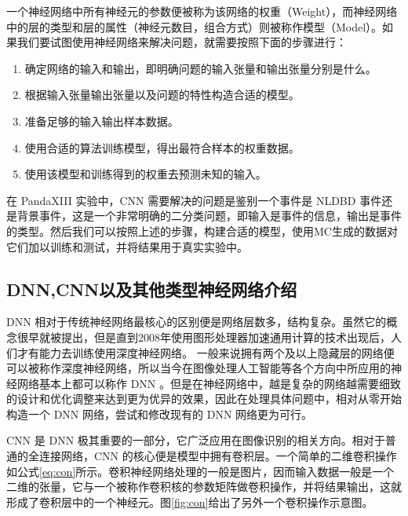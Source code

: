 一个神经网络中所有神经元的参数便被称为该网络的权重（Weight），而神经网络中的层的类型和层的属性（神经元数目，组合方式）则被称作模型（Model）。如果我们要试图使用神经网络来解决问题，就需要按照下面的步骤进行：
\begin{enumerate}
    \item 确定网络的输入和输出，即明确问题的输入张量和输出张量分别是什么。
    \item 根据输入张量输出张量以及问题的特性构造合适的模型。
    \item 准备足够的输入输出样本数据。
    \item 使用合适的算法训练模型，得出最符合样本的权重数据。
    \item 使用该模型和训练得到的权重去预测未知的输入。
\end{enumerate}
在 PandaXIII 实验中，CNN 需要解决的问题是鉴别一个事件是 NLDBD 事件还是背景事件，这是一个非常明确的二分类问题，即输入是事件的信息，输出是事件的类型。然后我们可以按照上述的步骤，构建合适的模型，使用MC生成的数据对它们加以训练和测试，并将结果用于真实实验中。

\subsection{DNN,CNN以及其他类型神经网络介绍}

DNN 相对于传统神经网络最核心的区别便是网络层数多，结构复杂。虽然它的概念很早就被提出，但是直到2008年使用图形处理器加速通用计算的技术出现后，人们才有能力去训练使用深度神经网络。 一般来说拥有两个及以上隐藏层的网络便可以被称作深度神经网络，所以当今在图像处理人工智能等各个方向中所应用的神经网络基本上都可以称作 DNN 。但是在神经网络中，越是复杂的网络越需要细致的设计和优化调整来达到更为优异的效果，因此在处理具体问题中，相对从零开始构造一个 DNN 网络，尝试和修改现有的 DNN 网络更为可行。

CNN 是 DNN 极其重要的一部分，它广泛应用在图像识别的相关方向。相对于普通的全连接网络，CNN 的核心便是模型中拥有卷积层。一个简单的二维卷积操作如公式\ref{eq:con}所示。卷积神经网络处理的一般是图片，因而输入数据一般是一个二维的张量，它与一个被称作卷积核的参数矩阵做卷积操作，并将结果输出，这就形成了卷积层中的一个神经元。图\ref{fig:con}给出了另外一个卷积操作示意图。

